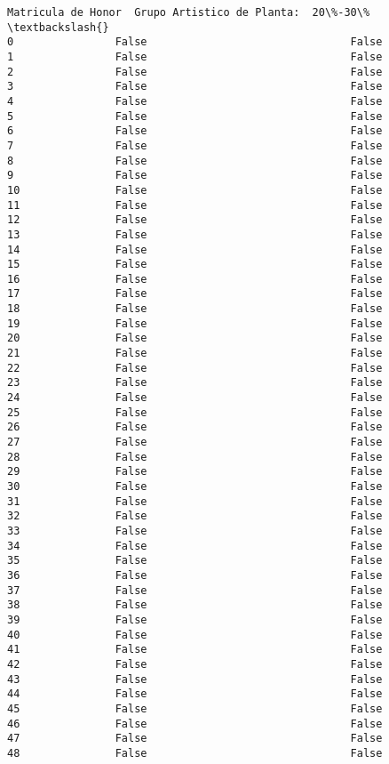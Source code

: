 \documentclass[11pt]{article}
\begin{document}
\begin{Verbatim}[commandchars=\\\{\}]
    Matricula de Honor  Grupo Artistico de Planta:  20\%-30\%  \textbackslash{}
0                False                                False   
1                False                                False   
2                False                                False   
3                False                                False   
4                False                                False   
5                False                                False   
6                False                                False   
7                False                                False   
8                False                                False   
9                False                                False   
10               False                                False   
11               False                                False   
12               False                                False   
13               False                                False   
14               False                                False   
15               False                                False   
16               False                                False   
17               False                                False   
18               False                                False   
19               False                                False   
20               False                                False   
21               False                                False   
22               False                                False   
23               False                                False   
24               False                                False   
25               False                                False   
26               False                                False   
27               False                                False   
28               False                                False   
29               False                                False   
30               False                                False   
31               False                                False   
32               False                                False   
33               False                                False   
34               False                                False   
35               False                                False   
36               False                                False   
37               False                                False   
38               False                                False   
39               False                                False   
40               False                                False   
41               False                                False   
42               False                                False   
43               False                                False   
44               False                                False   
45               False                                False   
46               False                                False   
47               False                                False   
48               False                                False   


\end{Verbatim}
\end{document}
